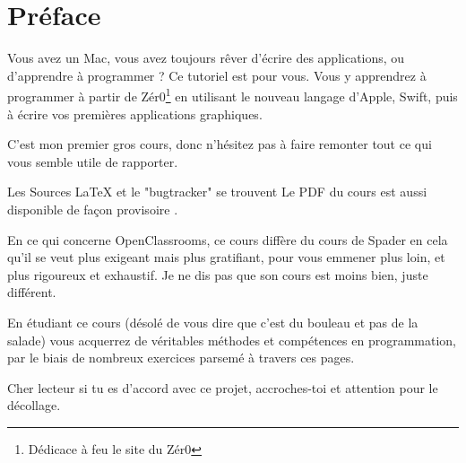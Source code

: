 \chapter*{Préface}
{}
Vous avez un Mac, vous avez toujours rêver d'écrire des applications, ou d'apprendre à programmer ?
Ce tutoriel est pour vous.
Vous y apprendrez à programmer à partir de Zér0\footnote{Dédicace à feu le site du Zér0}  en utilisant le nouveau langage d'Apple, Swift, puis à écrire vos premières applications graphiques.

C'est mon premier gros cours, donc n'hésitez pas à faire remonter tout ce qui vous semble utile de rapporter.

Les Sources LaTeX et le "bugtracker" se trouvent 
Le PDF du cours est aussi disponible de façon provisoire .

En ce qui concerne OpenClassrooms, ce cours diffère du cours de Spader en cela qu'il se veut plus exigeant mais plus gratifiant, pour vous emmener plus loin, et plus rigoureux et exhaustif.
Je ne dis pas que son cours est moins bien, juste différent.

En étudiant ce cours
(désolé de vous dire que c'est du bouleau et pas de la salade)
vous acquerrez de véritables méthodes et compétences en programmation,
par le biais de nombreux exercices parsemé à travers ces pages.

Cher lecteur si tu es d'accord avec ce projet, accroches-toi et attention pour le décollage.


